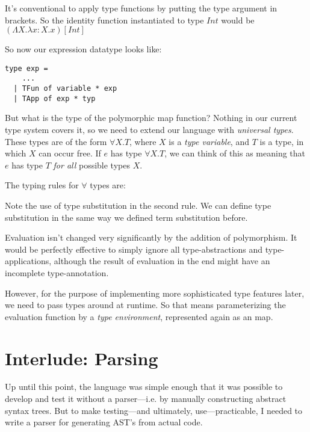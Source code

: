 \documentclass[pageno]{jpaper}
\begin{document}
{It's conventional to apply type functions by putting the type argument in brackets.  So the identity function
instantiated to type $Int$ would be $(\Lambda X.\lambda x:X.x) [Int]$

So now our expression datatype looks like:

\begin{lstlisting}
type exp =
    ...
  | TFun of variable * exp
  | TApp of exp * typ
\end{lstlisting}

But what is the type of the polymorphic map function? Nothing in our current type system covers it, so we need to
extend our language with \textit{universal types}. These types are of the form $\forall X. T$, where
$X$ is a \textit{type variable}, and $T$ is a type, in which $X$ can occur free.  If $e$
has type $\forall X.T$, we can think of this as meaning that $e$ has type $T$ \textit{for all} possible
types $X$.

The typing rules for $\forall$ types are\cite{pierce2002types}:

\begin{prooftree}
\end{prooftree}

\begin{prooftree}
\end{prooftree}

Note the use of type substitution in the second rule. We can define type substitution in
the same way we defined term substitution before.

Evaluation isn't changed very significantly by the addition of polymorphism.
It would be perfectly effective to simply ignore all type-abstractions and type-applications,
although the result of evaluation in the end might have an incomplete type-annotation.

However, for the purpose of implementing more sophisticated type features later, we need to pass
types around at runtime. So that means parameterizing the evaluation function by a \textit{type environment},
represented again as an map.

\section{Interlude: Parsing}

Up until this point, the language was simple enough that it was possible to develop and test it  without a parser---i.e. by manually constructing abstract syntax trees. But to make testing---and ultimately, use---practicable, I needed to write a parser for generating AST's from actual code.

}
\end{document}
